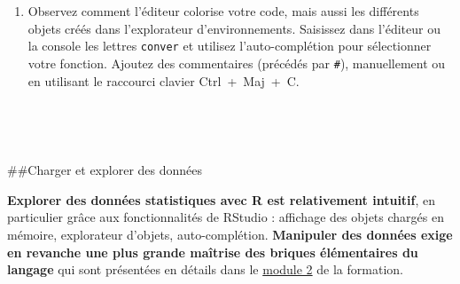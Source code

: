 \documentclass[12pt,twosided, notitlepage]{book}
\newenvironment{Shaded}{}{}
\newcommand{\CommentTok}[1]{\textcolor[rgb]{0.00,0.50,0.00}{#1}}
\newcommand{\ControlFlowTok}[1]{\textcolor[rgb]{0.00,0.00,1.00}{#1}}
\newcommand{\DecValTok}[1]{#1}
\newcommand{\KeywordTok}[1]{\textcolor[rgb]{0.00,0.00,1.00}{#1}}
\newcommand{\NormalTok}[1]{#1}
\newcommand{\OperatorTok}[1]{#1}
\newcommand{\StringTok}[1]{\textcolor[rgb]{0.00,0.50,0.50}{#1}}
\newif \ifsol
\renewenvironment{Shaded}{\begin{snugshade}}{\end{snugshade}}
\begin{document}
\begin{enumerate}
  \ifsol 

  \begin{center} \rule{0.5\linewidth}{\linethickness}\end{center}

\begin{Shaded}
\begin{Highlighting}[]
\CommentTok{# On reprend les éléments du cas pratique 1.1 pour rendre la fonction}
\CommentTok{# véritablement opérante :}
\NormalTok{conversion <-}\StringTok{ }\ControlFlowTok{function}\NormalTok{(duree)\{}
\NormalTok{  min <-}\StringTok{ }\NormalTok{duree }\OperatorTok{%
\NormalTok{  sec <-}\StringTok{ }\NormalTok{duree }\OperatorTok{%
\NormalTok{  resultat <-}\StringTok{ }\KeywordTok{paste}\NormalTok{(}
    \StringTok{"Le traitement a duré"}\NormalTok{, min, }\StringTok{"minutes et"}\NormalTok{, sec, }\StringTok{"secondes."}
\NormalTok{  )}
  \KeywordTok{return}\NormalTok{(resultat)}
\NormalTok{\}}
\KeywordTok{conversion}\NormalTok{(}\DecValTok{2456}\NormalTok{)}
\NormalTok{  ## [1] "Le traitement a duré 40 minutes et 56 secondes."}
\KeywordTok{conversion}\NormalTok{(}\DecValTok{7564}\NormalTok{)}
\NormalTok{  ## [1] "Le traitement a duré 126 minutes et 4 secondes."}
\end{Highlighting}
\end{Shaded}

  \begin{center} \rule{0.5\linewidth}{\linethickness}\end{center} 
    \bigskip 
    \fi
\item
  Observez comment l'éditeur colorise votre code, mais aussi les
  différents objets créés dans l'explorateur d'environnements. Saisissez
  dans l'éditeur ou la console les lettres \texttt{conver} et utilisez
  l'auto-complétion pour sélectionner votre fonction. Ajoutez des
  commentaires (précédés par \texttt{\#}), manuellement ou en utilisant
  le raccourci clavier Ctrl~+~Maj~+~C.
\end{enumerate}

~

~

\#\#Charger et explorer des données

\textbf{Explorer des données statistiques avec R est relativement
intuitif}, en particulier grâce aux fonctionnalités de RStudio :
affichage des objets chargés en mémoire, explorateur d'objets,
auto-complétion. \textbf{Manipuler des données exige en revanche une
plus grande maîtrise des briques élémentaires du langage} qui sont
présentées en détails dans le \underline{module 2} de la formation.
\end{document}
